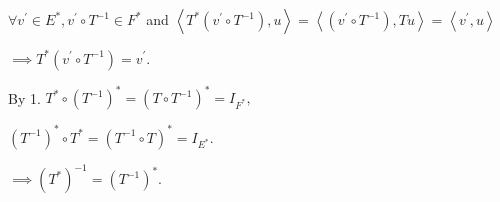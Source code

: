 \documentclass{article}
\begin{document}
$\forall v^{\prime }\in E^{\ast },v^{\prime }\circ T^{-1}\in F^{\ast }$ and $%
\left\langle T^{\ast }\left( v^{\prime }\circ T^{-1}\right) ,u\right\rangle
=\left\langle \left( v^{\prime }\circ T^{-1}\right) ,Tu\right\rangle
=\left\langle v^{\prime },u\right\rangle $

$\implies T^{\ast }\left( v^{\prime }\circ T^{-1}\right) =v^{\prime }.$

By 1. $T^{\ast }\circ \left( T^{-1}\right) ^{\ast }=\left( T\circ
T^{-1}\right) ^{\ast }=I_{F^{\ast }},$

$\left( T^{-1}\right) ^{\ast }\circ T^{\ast }=\left( T^{-1}\circ T\right)
^{\ast }=I_{E^{\ast }}.$

$\implies \left( T^{\ast }\right) ^{-1}=\left( T^{-1}\right) ^{\ast }.$
\end{document}
